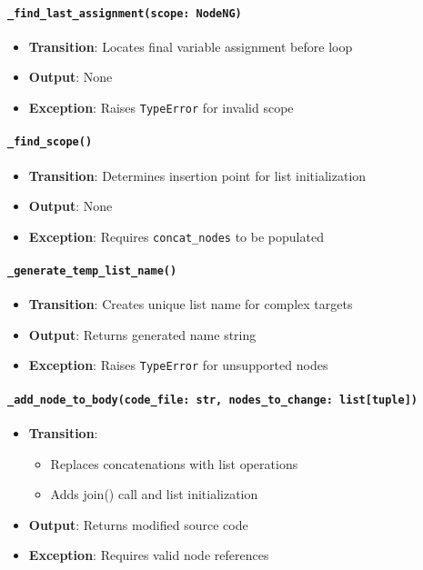 \documentclass[12pt, titlepage]{article}
\begin{document}
  \paragraph{\texttt{\_find\_last\_assignment(scope: NodeNG)}}
  \begin{itemize}
  \item \textbf{Transition}: Locates final variable assignment before loop
  \item \textbf{Output}: None
  \item \textbf{Exception}: Raises \texttt{TypeError} for invalid scope
  \end{itemize}
  
  \paragraph{\texttt{\_find\_scope()}}
  \begin{itemize}
  \item \textbf{Transition}: Determines insertion point for list initialization
  \item \textbf{Output}: None
  \item \textbf{Exception}: Requires \texttt{concat\_nodes} to be populated
  \end{itemize}
  
  \paragraph{\texttt{\_generate\_temp\_list\_name()}}
  \begin{itemize}
  \item \textbf{Transition}: Creates unique list name for complex targets
  \item \textbf{Output}: Returns generated name string
  \item \textbf{Exception}: Raises \texttt{TypeError} for unsupported nodes
  \end{itemize}
  
  \paragraph{\texttt{\_add\_node\_to\_body(code\_file: str, nodes\_to\_change: list[tuple])}}
  \begin{itemize}
  \item \textbf{Transition}:
  \begin{itemize}
  \item Replaces concatenations with list operations
  \item Adds join() call and list initialization
  \end{itemize}
  \item \textbf{Output}: Returns modified source code
  \item \textbf{Exception}: Requires valid node references
  \end{itemize}
\end{document}
